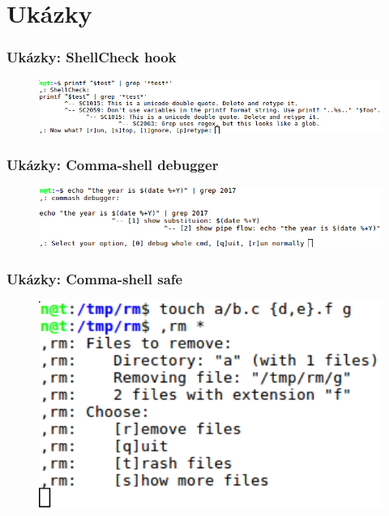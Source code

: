 \documentclass{beamer}
\begin{document}
\section{Ukázky}

\begin{frame}
	\frametitle{Ukázky: ShellCheck hook}
	\begin{figure}
		\centering
		\includegraphics[width=1.0\textwidth]{./images/shellcheck}
	\end{figure}	
\end{frame}


\begin{frame}
	\frametitle{Ukázky: Comma-shell debugger}
	\begin{figure}
		\centering
		\includegraphics[width=1.0\textwidth]{./images/debugger}
	\end{figure}
\end{frame}

\begin{frame}
	\frametitle{Ukázky: Comma-shell safe}
	\begin{figure}
		\centering
		\includegraphics[width=1.0\textwidth]{./images/rm}
	\end{figure}
\end{frame}
\end{document}
